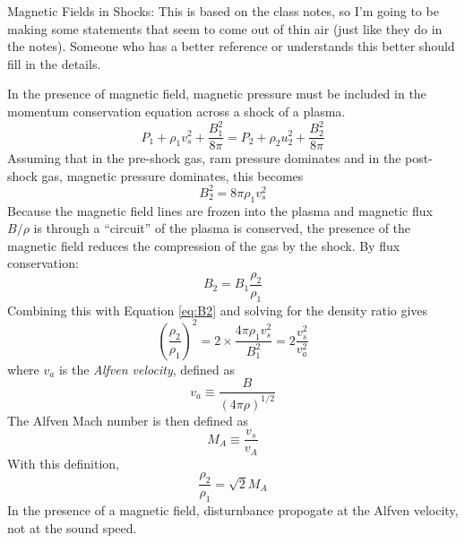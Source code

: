 Magnetic Fields in Shocks:\newline
This is based on the class notes, so I'm going to be making some statements 
that seem to come out of thin air (just like they do in the notes).  Someone 
who has a better reference or understands this better should fill in the 
details.  

In the presence of magnetic field, magnetic pressure must be included in 
the momentum conservation equation across a shock of a plasma.  
\begin{equation}
P_1+\rho_1v_s^2+\frac{B_1^2}{8\pi}=P_2+\rho_2u_2^2+\frac{B_2^2}{8\pi}
\end{equation}
Assuming that in the pre-shock gas, ram pressure dominates and in the post-
shock gas, magnetic pressure dominates, this becomes
\begin{equation}\label{eq:B2}
B_2^2=8\pi\rho_1v_s^2
\end{equation}
Because the magnetic field lines are frozen into the plasma and magnetic flux 
$B/\rho$ is through a ``circuit'' of the plasma is conserved, the presence 
of the magnetic field reduces the compression of the gas by the shock.  
By flux conservation:
\begin{equation}
B_2=B_1\frac{\rho_2}{\rho_1}
\end{equation}
Combining this with Equation \ref{eq:B2} and solving for the density ratio gives
\begin{equation}
\left(\frac{\rho_2}{\rho_1}\right)^2=2\times\frac{4\pi\rho_1v_s^2}{B_1^2}=2\frac{v_s^2}{v_a^2}
\end{equation}
where $v_a$ is the \emph{Alfven velocity}, defined as
\begin{equation}
v_a\equiv\frac{B}{(4\pi\rho)^{1/2}}
\end{equation}
The Alfven Mach number is then defined as 
\begin{equation}
M_A\equiv\frac{v_s}{v_A}
\end{equation}
With this definition, 
\begin{equation}
\frac{\rho_2}{\rho_1}=\sqrt{2}M_A
\end{equation}
In the presence of a magnetic field, disturnbance propogate at the Alfven 
velocity, not at the sound speed.  

